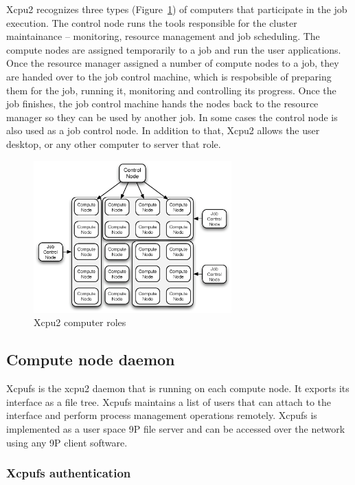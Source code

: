 \documentclass[10pt,conference,letterpaper]{IEEEtran}
\begin{document}
Xcpu2 recognizes three types (Figure~\ref{fig:xcpu2-nodes}) of computers
that participate in the job execution. The control node runs the tools
responsible for the cluster maintainance -- monitoring, resource management
and job scheduling. The compute nodes are assigned temporarily to a job and
run the user applications. Once the resource manager assigned a number of
compute nodes to a job, they are handed over to the job control machine,
which is respobsible of preparing them for the job, running it, monitoring
and controlling its progress. Once the job finishes, the job control machine
hands the nodes back to the resource manager so they can be used by another
job. In some cases the control node is also used as a job control node.
In addition to that, Xcpu2 allows the user desktop, or any other computer to
server that role.

\begin{figure}[h]
\begin{center}
\includegraphics[width=3in, keepaspectratio]{xcpu2-nodes.eps}
\end{center}
\caption{Xcpu2 computer roles}
\label{fig:xcpu2-nodes}
\end{figure}

\subsection{Compute node daemon}

Xcpufs is the xcpu2 daemon that is running on each compute node. It exports
its interface as a file tree. Xcpufs maintains a list of users that can
attach to the interface and perform process management operations remotely.
Xcpufs is implemented as a user space 9P file server and can be accessed
over the network using any 9P client software.

\subsubsection{Xcpufs authentication}
\end{document}
